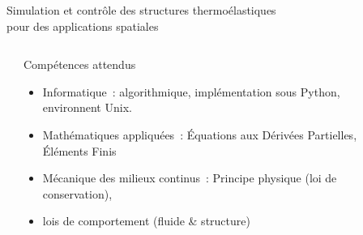 \documentclass[final]{beamer}
\newlength{\sepwid}
\begin{document}
\begin{frame}[t]{\LARGE \hspace{13cm}
Simulation et contrôle des structures thermoélastiques \\ \hspace{13cm} pour des applications spatiales
}
\begin{columns} 
	\begin{column}{\sepwid}\end{column} %
	
	\begin{column}{0.95\textwidth}
		\begin{block}{Compétences attendus \vspace{1cc}}
			\begin{itemize}
				\item Informatique : algorithmique, implémentation sous Python, environnent Unix.
				\item Mathématiques appliquées : Équations aux Dérivées Partielles, Éléments Finis
				\item Mécanique des milieux continus : Principe physique (loi de conservation), \item lois de comportement (fluide \& structure)
			\end{itemize}
		\end{block}
	\end{column} 
	\begin{column}{\sepwid}\end{column} %
\end{columns}

\end{frame} %
\end{document}
